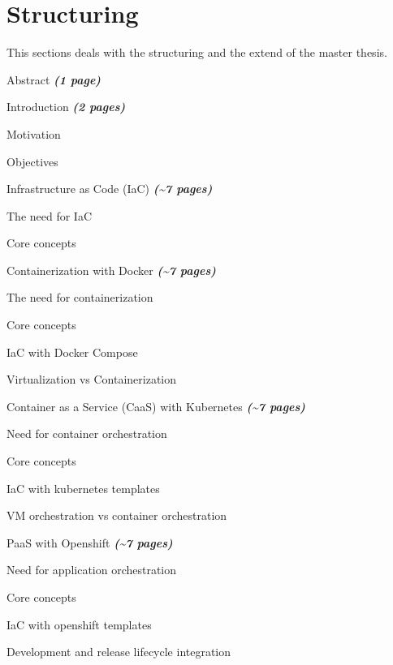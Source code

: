 \section{Structuring}
\label{sec:thesis-structuring}
This sections deals with the structuring and the extend of the master thesis.
\begin{numbered}
	\item Abstract \textbf{\textit{(1 page)}}
	\item Introduction \textbf{\textit{(2 pages)}}
	\begin{numbered}
		\item Motivation
		\item Objectives
	\end{numbered}
	\item Infrastructure as Code (IaC) \textbf{\textit{(\textasciitilde 7 pages)}}
	\begin{numbered}
		\item The need for IaC
		\item Core concepts
	\end{numbered}
	\item Containerization with Docker \textbf{\textit{(\textasciitilde 7 pages)}}
	\begin{numbered}
		\item The need for containerization
		\item Core concepts
		\item IaC with Docker Compose
		\item Virtualization vs Containerization
	\end{numbered}
	\item Container as a Service (CaaS) with Kubernetes \textbf{\textit{(\textasciitilde 7 pages)}}
	\begin{numbered}
		\item Need for container orchestration
		\item Core concepts
		\item IaC with kubernetes templates
		\item VM orchestration vs container orchestration
	\end{numbered}
	\item PaaS with Openshift \textbf{\textit{(\textasciitilde 7 pages)}}
	\begin{numbered}
		\item Need for application orchestration
		\item Core concepts
		\item IaC with openshift templates
		\item Development and release lifecycle integration

\end{numbered}
\end{numbered}
